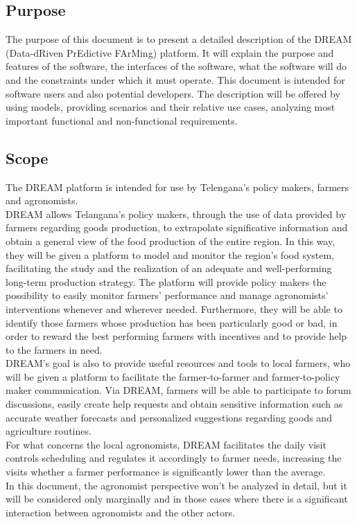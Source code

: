 \documentclass[10pt]{article}
\begin{document}
\subsection{Purpose}
The purpose of this document is to present a detailed description of the DREAM
 (Data-dRiven PrEdictive FArMing) platform. It will explain the purpose and features of 
 the software, the interfaces of the software, what the software will do and the constraints
  under which it must operate. This document is intended for software users and also 
  potential developers. The description will be offered by using models, providing scenarios and 
  their relative use cases, analyzing most important functional and non-functional requirements.
\subsection{Scope} %
The DREAM platform is intended for use by Telengana's policy makers, farmers and agronomists.\\
DREAM allows Telangana's policy makers, through the use of data provided by farmers regarding goods 
production, to extrapolate significative information and obtain a general view of the food production of the entire region. 
In this way, they will be given a platform to model and monitor the region's food system, facilitating the study and the 
realization of an adequate and well-performing long-term production strategy. The platform will provide policy makers the possibility 
to easily monitor farmers' performance and manage agronomists' interventions whenever and wherever needed. 
Furthermore, they will be able to identify those farmers whose production has been particularly good or bad,
in order to reward the best performing farmers with incentives and to provide help to the farmers in need.\\ 
DREAM's goal is also to provide useful resources and tools to local farmers, who will be given a platform to facilitate 
the farmer-to-farmer and farmer-to-policy maker communication. Via DREAM, farmers will be able to participate to forum
discussions, easily create help requests and obtain sensitive information such as accurate weather forecasts and personalized 
suggestions regarding goods and agriculture routines.\\
For what concerns the local agronomists, DREAM facilitates the daily visit controls scheduling and regulates it accordingly
to farmer needs, increasing the visits whether a farmer performance is significantly lower than the average.\\
In this document, the agronomist perspective won't be analyzed in detail, but it will be considered only marginally and in those
cases where there is a significant interaction between agronomists and the other actors.
\end{document}
